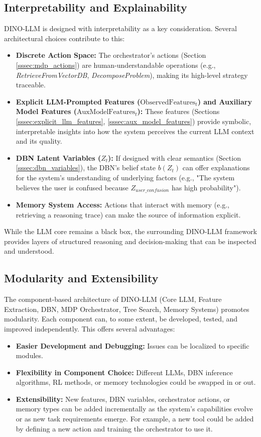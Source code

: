 \documentclass[11pt]{article}
\begin{document}
\subsection{Interpretability and Explainability}
\label{ssec:tg_interpretability}
DINO-LLM is designed with interpretability as a key consideration. Several architectural choices contribute to this:
\begin{itemize}
    \item \textbf{Discrete Action Space:} The orchestrator's actions (Section \ref{sssec:mdp_actions}) are human-understandable operations (e.g., \emph{RetrieveFromVectorDB}, \emph{DecomposeProblem}), making its high-level strategy traceable.
    \item \textbf{Explicit LLM-Prompted Features ($\text{ObservedFeatures}_t$) and Auxiliary Model Features ($\text{AuxModelFeatures}_t$):} These features (Sections \ref{sssec:explicit_llm_features}, \ref{sssec:aux_model_features}) provide symbolic, interpretable insights into how the system perceives the current LLM context and its quality.
    \item \textbf{DBN Latent Variables ($Z_t$):} If designed with clear semantics (Section \ref{sssec:dbn_variables}), the DBN's belief state $b(Z_t)$ can offer explanations for the system's understanding of underlying factors (e.g., "The system believes the user is confused because $Z_{user\_confusion}$ has high probability").
    \item \textbf{Memory System Access:} Actions that interact with memory (e.g., retrieving a reasoning trace) can make the source of information explicit.
\end{itemize}
While the LLM core remains a black box, the surrounding DINO-LLM framework provides layers of structured reasoning and decision-making that can be inspected and understood.

\subsection{Modularity and Extensibility}
\label{ssec:tg_modularity}
The component-based architecture of DINO-LLM (Core LLM, Feature Extraction, DBN, MDP Orchestrator, Tree Search, Memory Systems) promotes modularity. Each component can, to some extent, be developed, tested, and improved independently. This offers several advantages:
\begin{itemize}
    \item \textbf{Easier Development and Debugging:} Issues can be localized to specific modules.
    \item \textbf{Flexibility in Component Choice:} Different LLMs, DBN inference algorithms, RL methods, or memory technologies could be swapped in or out.
    \item \textbf{Extensibility:} New features, DBN variables, orchestrator actions, or memory types can be added incrementally as the system's capabilities evolve or as new task requirements emerge. For example, a new tool could be added by defining a new action and training the orchestrator to use it.
\end{itemize}
\end{document}
